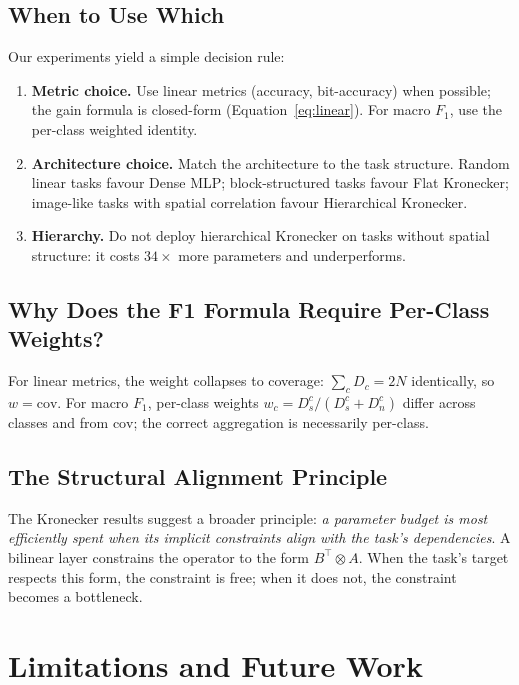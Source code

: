 \documentclass[11pt,a4paper]{article}
\begin{document}
\subsection{When to Use Which}
\label{sec:decision}

Our experiments yield a simple decision rule:

\begin{enumerate}
\item \textbf{Metric choice.} Use linear metrics (accuracy,
bit-accuracy) when possible; the gain formula is closed-form
(Equation~\ref{eq:linear}). For macro $F_1$, use the per-class
weighted identity.
\item \textbf{Architecture choice.} Match the architecture to the task
structure. Random linear tasks favour Dense MLP; block-structured
tasks favour Flat Kronecker; image-like tasks with spatial correlation
favour Hierarchical Kronecker.
\item \textbf{Hierarchy.} Do not deploy hierarchical Kronecker on
tasks without spatial structure: it costs $34\times$ more parameters
and underperforms.
\end{enumerate}

\subsection{Why Does the F1 Formula Require Per-Class Weights?}

For linear metrics, the weight collapses to coverage:
$\sum_c D_c = 2N$ identically, so $w = \text{cov}$.
For macro $F_1$, per-class weights $w_c = D_s^c / (D_s^c + D_n^c)$
differ across classes and from $\text{cov}$; the correct aggregation
is necessarily per-class.

\subsection{The Structural Alignment Principle}

The Kronecker results suggest a broader principle: \emph{a parameter
budget is most efficiently spent when its implicit constraints align
with the task's dependencies}. A bilinear layer constrains the operator
to the form $B^\top \otimes A$. When the task's target respects this
form, the constraint is free; when it does not, the constraint becomes
a bottleneck.


\section{Limitations and Future Work}
\label{sec:limitations}
\end{document}
